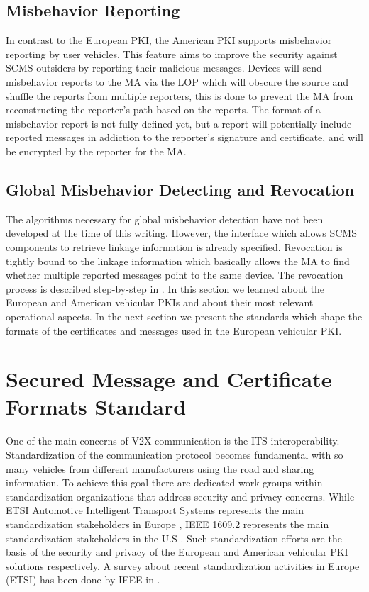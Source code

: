 \subsection{Misbehavior Reporting}

In contrast to the European PKI, the American PKI supports misbehavior reporting by user vehicles. This feature aims to improve the security against SCMS outsiders by reporting their malicious messages. 
Devices will send misbehavior reports to the MA via the LOP which will obscure the source and shuffle the reports from multiple reporters, this is done to prevent the MA from reconstructing the reporter’s path based on the reports. The format of a misbehavior report is not fully defined yet, but a report will potentially include reported messages in addiction to the reporter’s signature and certificate, and will be encrypted by the reporter for the MA.

\subsection{Global Misbehavior Detecting and Revocation}

The algorithms necessary for global misbehavior detection have not been developed at the time of this writing. However, the interface which allows SCMS components to retrieve linkage information is already specified.
Revocation is tightly bound to the linkage information which basically allows the MA to find whether multiple reported messages point to the same device.
The revocation process is described step-by-step in \cite{scms}. In this section we learned about the European and American vehicular PKIs and about their most relevant operational aspects. In the next section we present the standards which shape the formats of the certificates and messages used in the European vehicular PKI.

\section{Secured Message and Certificate Formats Standard}\label{standards}
One of the main concerns of V2X communication is the ITS interoperability. Standardization of the communication protocol becomes fundamental with so many vehicles from different manufacturers using the road and sharing information. To achieve this goal there are dedicated work groups within standardization organizations that address security and privacy concerns. While ETSI Automotive Intelligent Transport Systems represents the main standardization stakeholders in Europe \cite{etsi_workgroup}, IEEE 1609.2 represents the main standardization stakeholders in the U.S \cite{iee_formats}. Such standardization efforts are the basis of the security and privacy of the European and American vehicular PKI solutions respectively. A survey about recent standardization activities in Europe (ETSI) has been done by IEEE in \cite{wow}.

